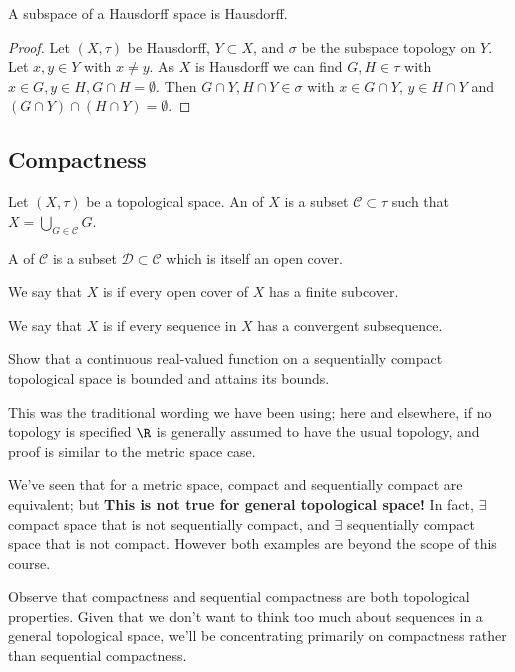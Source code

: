 \begin{proposition} \label{prp:32}
A subspace of a Hausdorff space is Hausdorff.
\end{proposition}

\begin{proof}
Let $(X,\tau)$ be Hausdorff, $Y\subset X$, and $\sigma$ be the subspace topology on $Y$. Let $x,y\in Y$ with $x\neq y$. As $X$ is Hausdorff we can find $G,H\in \tau$ with $x\in G, y\in H, G\cap H = \emptyset$. Then $G\cap Y, H\cap Y \in \sigma$ with $x\in G\cap Y$, $y\in H\cap Y$ and $(G\cap Y)\cap (H\cap Y) = \emptyset$.
\end{proof}

\subsection{Compactness}
\begin{definition}
    Let $(X,\tau)$ be a topological space. An  of $X$ is a subset $\mathcal{C}\subset \tau$ such that $X = \bigcup_{G\in\mathcal{C}} G$.
\end{definition}

\begin{definition}[Subcover]
    A  of $\mathcal{C}$ is a subset $\mathcal{D}\subset \mathcal{C}$ which is itself an open cover.
\end{definition} 

\begin{definition}[Compactness]
    We say that $X$ is  if every open cover of $X$ has a finite subcover.
\end{definition}

\begin{definition}
    We say that $X$ is  if every sequence in $X$ has a convergent subsequence.
\end{definition} 

\begin{exercise}
Show that a continuous real-valued function on a sequentially compact topological space is bounded and attains its bounds.
\end{exercise}

\begin{remark}
This was the traditional wording we have been using; here and elsewhere, if no topology is specified $\R$ is generally assumed to have the usual topology, and proof is similar to the metric space case.

We've seen that for a metric space, compact and sequentially compact are equivalent; but \textbf{\color{red} This is not true for general topological space!} In fact, $\exists$ compact space that is not sequentially compact, and $\exists$ sequentially compact space that is not compact. However both examples are beyond the scope of this course.

Observe that compactness and sequential compactness are both topological properties. Given that we don't want to think too much about sequences in a general topological space, we'll be concentrating primarily on compactness rather than sequential compactness.
\end{remark}

